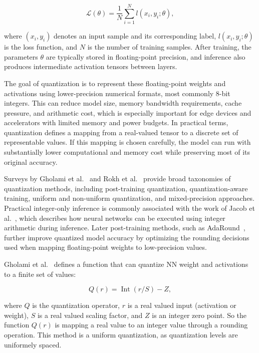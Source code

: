 \documentclass[12pt,a4paper]{report}
\begin{document}
\begin{equation}
\mathcal{L}(\theta) = \frac{1}{N} \sum_{i=1}^{N} l(x_i, y_i; \theta),
\end{equation}

where $(x_i, y_i)$ denotes an input sample and its corresponding label, $l(x_i, y_i; \theta)$ is
the loss function, and $N$ is the number of training samples. After training, the parameters
$\theta$ are typically stored in floating-point precision, and inference also produces intermediate
activation tensors between layers.

The goal of quantization is to represent these floating-point weights and activations using
lower-precision numerical formats, most commonly 8-bit integers. This can reduce model size,
memory bandwidth requirements, cache pressure, and arithmetic cost, which is especially important
for edge devices and accelerators with limited memory and power budgets. In practical terms,
quantization defines a mapping from a real-valued tensor to a discrete set of representable values.
If this mapping is chosen carefully, the model can run with substantially lower computational and
memory cost while preserving most of its original accuracy.

Surveys by Gholami et al.~\cite{gholami2022survey} and Rokh et al.~\cite{rokh2023comprehensive}
provide broad taxonomies of quantization methods, including post-training quantization,
quantization-aware training, uniform and non-uniform quantization, and mixed-precision
approaches. Practical integer-only inference is commonly associated with the work of
Jacob et al.~\cite{jacob2018quantization}, which describes how neural networks can be executed
using integer arithmetic during inference. Later post-training methods, such as
AdaRound~\cite{nagel2020up}, further improve quantized model accuracy by optimizing the
rounding decisions used when mapping floating-point weights to low-precision values.

Gholami et al.~\cite{gholami2022survey} defines a function that can quantize NN weight and activations to a finite
set of values:

\begin{equation}
Q(r) = \operatorname{Int}(r / S) - Z,
\end{equation}

where $Q$ is the quantization operator, $r$ is a real valued input (activation or weight), $S$ is a real valued scaling
factor, and $Z$ is an integer zero point. So the function $Q(r)$ is mapping a real value to an integer value through a
rounding operation. This method is a uniform quantization, as quantization levels are uniformely spaced.
\end{document}
